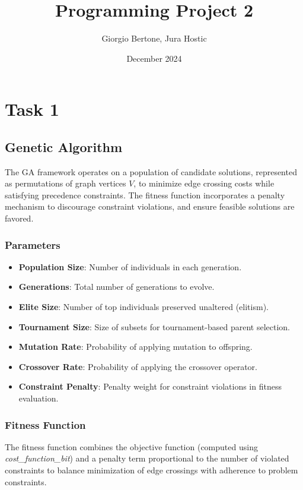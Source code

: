 \documentclass{article}
\title{Programming Project 2}
\author{Giorgio Bertone, Jura Hostic}
\date{December 2024}
\begin{document}
\maketitle

\section{Task 1}
\subsection{Genetic Algorithm}

The GA framework operates on a population of candidate solutions, represented as permutations of graph vertices $V$, to minimize edge crossing costs while satisfying precedence constraints. The fitness function incorporates a penalty mechanism to discourage constraint violations, and ensure feasible solutions are favored.

\subsubsection*{Parameters}
\begin{itemize}
    \item \textbf{Population Size}: Number of individuals in each generation.
    \item \textbf{Generations}: Total number of generations to evolve.
    \item \textbf{Elite Size}: Number of top individuals preserved unaltered (elitism).
    \item \textbf{Tournament Size}: Size of subsets for tournament-based parent selection.
    \item \textbf{Mutation Rate}: Probability of applying mutation to offspring.
    \item \textbf{Crossover Rate}: Probability of applying the crossover operator.
    \item \textbf{Constraint Penalty}: Penalty weight for constraint violations in fitness evaluation.
\end{itemize}

\subsubsection*{Fitness Function}
The fitness function combines the objective function (computed using \textit{cost\_function\_bit}) and a penalty term proportional to the number of violated constraints to balance minimization of edge crossings with adherence to problem constraints.
\end{document}
